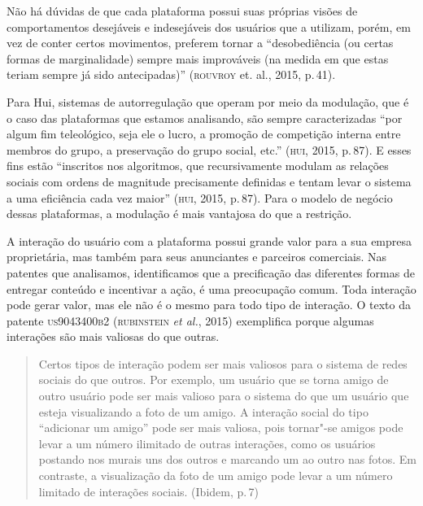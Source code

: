 Não há dúvidas de que cada plataforma possui suas próprias visões de
comportamentos desejáveis e indesejáveis dos usuários que a utilizam,
porém, em vez de conter certos movimentos, preferem tornar a
``desobediência (ou certas formas de marginalidade) sempre mais
improváveis (na medida em que estas teriam sempre já sido antecipadas)''
(\textsc{rouvroy} et. al., 2015, p.\,41).

Para Hui, sistemas de autorregulação que operam por meio da modulação,
que é o caso das plataformas que estamos analisando, são sempre
caracterizadas ``por algum fim teleológico, seja ele o lucro, a promoção
de competição interna entre membros do grupo, a preservação do grupo
social, etc.'' (\textsc{hui}, 2015, p.\,87). E esses fins estão ``inscritos nos
algoritmos, que recursivamente modulam as relações sociais com ordens de
magnitude precisamente definidas e tentam levar o sistema a uma
eficiência cada vez maior'' (\textsc{hui}, 2015, p.\,87). Para o modelo de negócio
dessas plataformas, a modulação é mais vantajosa do que a restrição.

A interação do usuário com a plataforma possui grande valor para a sua
empresa proprietária, mas também para seus anunciantes e parceiros
comerciais. Nas patentes que analisamos, identificamos que a
precificação das diferentes formas de entregar conteúdo e incentivar a
ação, é uma preocupação comum. Toda interação pode gerar valor, mas ele
não é o mesmo para todo tipo de interação. O texto da patente
\textsc{us9043400b2} (\textsc{rubinstein} \textit{et al.}, 2015) exemplifica porque algumas
interações são mais valiosas do que outras.

\begin{quote}
Certos tipos de interação podem ser mais valiosos para o sistema de
redes sociais do que outros. Por exemplo, um usuário que se torna amigo
de outro usuário pode ser mais valioso para o sistema do que um usuário
que esteja visualizando a foto de um amigo. A interação social do tipo
``adicionar um amigo'' pode ser mais valiosa, pois tornar"-se amigos pode
levar a um número ilimitado de outras interações, como os usuários
postando nos murais uns dos outros e marcando um ao outro nas fotos. Em
contraste, a visualização da foto de um amigo pode levar a um número
limitado de interações sociais. (Ibidem, p.\,7)
\end{quote}


